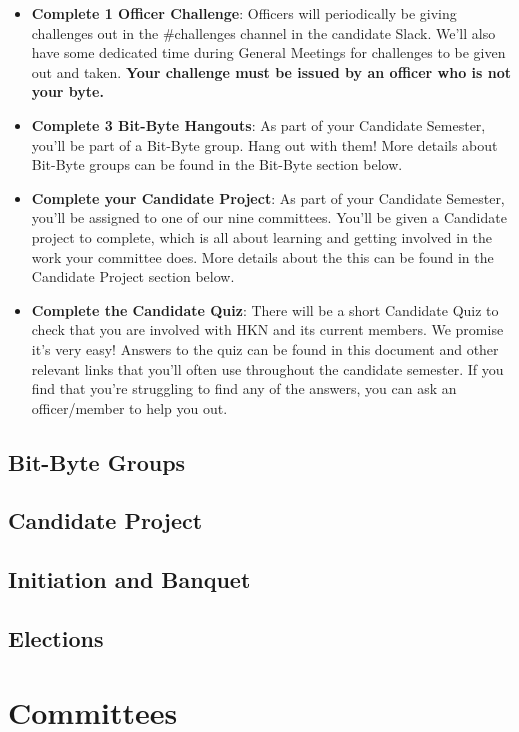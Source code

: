 \documentclass[11pt, article, oneside]{memoir}
\begin{document}
\begin{itemize}
                \item \textbf{Complete 1 Officer Challenge}: Officers will periodically be giving challenges out in the \#challenges channel in the candidate Slack. We'll also have some dedicated time during General Meetings for challenges to be given out and taken. \textbf{Your challenge must be issued by an officer who is not your byte.}
                \item \textbf{Complete 3 Bit-Byte Hangouts}: As part of your Candidate Semester, you'll be part of a Bit-Byte group. Hang out with them! More details about Bit-Byte groups can be found in the Bit-Byte section below.
                \item \textbf{Complete your Candidate Project}: As part of your Candidate Semester, you'll be assigned to one of our nine committees. You'll be given a Candidate project to complete, which is all about learning and getting involved in the work your committee does. More details about the this can be found in the Candidate Project section below.
                \item \textbf{Complete the Candidate Quiz}: There will be a short Candidate Quiz to check that you are involved with HKN and its current members. We promise it's very easy! Answers to the quiz can be found in this document and other relevant links that you'll often use throughout the candidate semester. If you find that you're struggling to find any of the answers, you can ask an officer/member to help you out.
            \end{itemize}



    \section{Bit-Byte Groups}
    \section{Candidate Project}
    \section{Initiation and Banquet}
    \section{Elections}



    \newpage
    \chapter{Committees}
\end{document}
